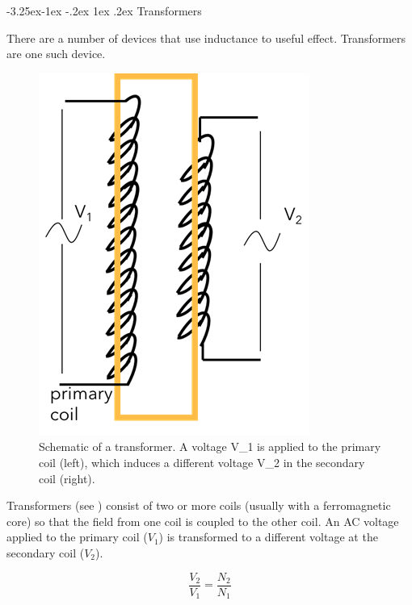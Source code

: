 \documentclass[
]{book}
\makeatletter
\renewcommand\subsection{%
\@startsection{subsection}{2}{\z@}%
              {-3.25ex\@plus -1ex \@minus -.2ex}%
              {1ex \@plus .2ex}%
              {\sffamily\bfseries}}
\numberwithin{equation}{section}
\makeatother
\begin{document}
\hypertarget{transformers}{%
\subsection{Transformers}\label{transformers}}

There are a number of devices that use inductance to useful effect.
Transformers are one such device.

\begin{figure}

{\centering \includegraphics[width=0.7\linewidth]{Figures/transformers} 

}

\caption{Schematic of a transformer. A voltage V_1 is applied to the primary coil (left), which induces a different voltage V_2 in the secondary coil (right).}\label{fig:transformers}
\end{figure}

Transformers (see ) consist of two or more coils (usually with a
ferromagnetic core) so that the field from one coil is coupled to the
other coil. An AC voltage applied to the primary coil (\(V_1\)) is
transformed to a different voltage at the secondary coil (\(V_2\)).

\begin{equation}
\label{eq:transformer}
\frac{V_2}{V_1} = \frac{N_2}{N_1}
\end{equation}
\end{document}
